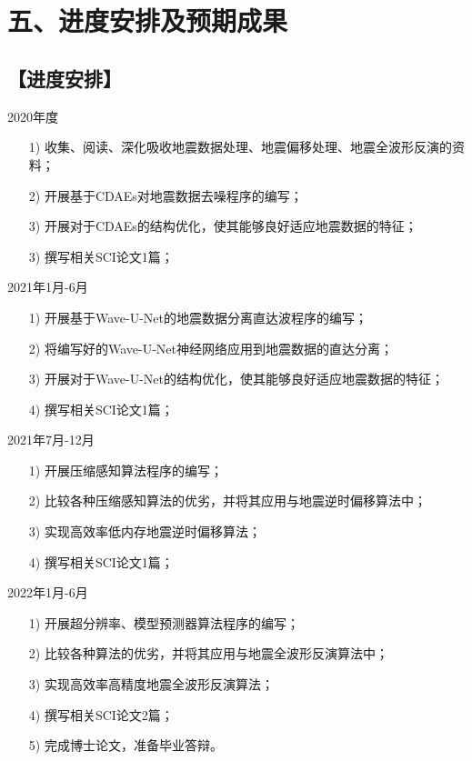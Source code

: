 \documentclass[11pt]{article}
\newcommand{\hei}{\CJKfamily{hei}}
\newcommand{\kai}{\CJKfamily{kai}}
\begin{document}
\section*{\hei\fontsize{11pt}{10pt} \selectfont \\ 五、进度安排及预期成果}
\subsection*{\kai\fontsize{11pt}{10pt} \selectfont【进度安排】}
2020年度
\begin{itemize}[itemindent=10pt]
\setlength{\itemsep}{-5pt}
\item [1)] 
收集、阅读、深化吸收地震数据处理、地震偏移处理、地震全波形反演的资料；   
\item [2)]
开展基于CDAEs对地震数据去噪程序的编写；
\item [3)]
开展对于CDAEs的结构优化，使其能够良好适应地震数据的特征；
\item [3)]
撰写相关SCI论文1篇；
\end{itemize}
\par
2021年1月-6月
\begin{itemize}[itemindent=10pt]
\setlength{\itemsep}{-5pt}
\item [1)] 
开展基于Wave-U-Net的地震数据分离直达波程序的编写；  
\item [2)]
将编写好的Wave-U-Net神经网络应用到地震数据的直达分离；
\item [3)]
开展对于Wave-U-Net的结构优化，使其能够良好适应地震数据的特征；
\item [4)]
撰写相关SCI论文1篇；
\end{itemize}
\par
2021年7月-12月
\begin{itemize}[itemindent=10pt]
\setlength{\itemsep}{-5pt}
\item [1)] 
开展压缩感知算法程序的编写；  
\item [2)]
比较各种压缩感知算法的优劣，并将其应用与地震逆时偏移算法中；
\item [3)]
实现高效率低内存地震逆时偏移算法；
\item [4)]
撰写相关SCI论文1篇；
\end{itemize}
\par
2022年1月-6月
\begin{itemize}[itemindent=10pt]
\setlength{\itemsep}{-5pt}
\item [1)] 
开展超分辨率、模型预测器算法程序的编写；  
\item [2)]
比较各种算法的优劣，并将其应用与地震全波形反演算法中；
\item [3)]
实现高效率高精度地震全波形反演算法；
\item [4)]
撰写相关SCI论文2篇；
\item [5)]
完成博士论文，准备毕业答辩。
\end{itemize}
\par
\end{document}
